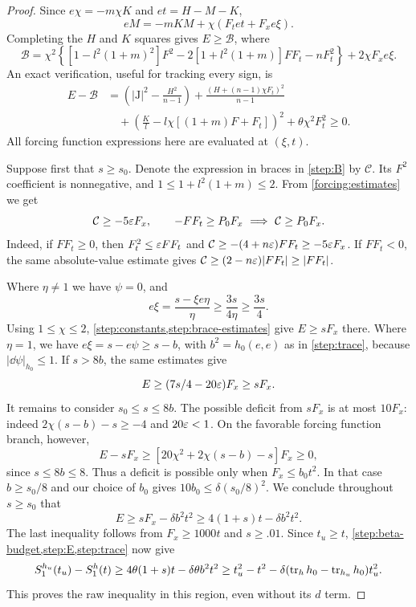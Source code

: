 \begin{proof}
Since $e\chi=-m\chi K$ and $et=H-M-K$,
\[
 eM=-mKM+\chi(F_t et+F_xe\xi).
\]
Completing the $H$ and $K$ squares gives $E\ge\mathcal B$, where
\begin{equation}\label{step:B}
 \mathcal B=\chi^2\left\{
 [1-l^2(1+m)^2]F^2
 -2[1+l^2(1+m)]FF_t-nF_t^2\right\}
 +2\chi F_xe\xi.
\end{equation}
An exact verification, useful for tracking every sign, is
\begin{align*}
 E-\mathcal B
 &=\left(|\mathrm J|^2-\frac{H^2}{n-1}\right)
 +\frac{(H+(n-1)\chi F_t)^2}{n-1}\\
 &\quad+\left(\frac K l-l\chi[(1+m)F+F_t]\right)^2
 +\theta\chi^2F_t^2\ge0.
\end{align*}
All forcing function expressions here are evaluated at $(\xi,t)$.

Suppose first that $s\ge s_0$.  Denote the expression in braces in
\cref{step:B} by $\mathcal C$.  Its $F^2$ coefficient is nonnegative,
and $1\le1+l^2(1+m)\le2$.  From \cref{forcing:estimates} we get
\begin{equation}\label{step:brace-estimates}
 \mathcal C\ge-5\varepsilon F_x,
 \qquad
 -FF_t\ge P_0F_x\ \Longrightarrow\ \mathcal C\ge P_0F_x.
\end{equation}
Indeed, if $FF_t\ge0$, then $F_t^2\le\varepsilon FF_t$ and
$\mathcal C\ge-(4+n\varepsilon)FF_t\ge-5\varepsilon F_x$.
If $FF_t<0$, the same absolute-value estimate gives
$\mathcal C\ge(2-n\varepsilon)|FF_t|\ge|FF_t|$.

Where $\eta\ne1$ we have $\psi=0$, and
\[
 e\xi=\frac{s-\xi e\eta}{\eta}\ge\frac{3s}{4\eta}\ge\frac{3s}4.
\]
Using $1\le\chi\le2$, \cref{step:constants,step:brace-estimates}
give $E\ge sF_x$ there.  Where $\eta=1$, we have
$e\xi=s-e\psi\ge s-b$, with $b^2=h_0(e,e)$ as in \cref{step:trace},
because $|\dd\psi|_{h_0}\le1$.
If $s>8b$, the same estimates give
\[
 E\ge(7s/4-20\varepsilon)F_x\ge sF_x.
\]
It remains to consider $s_0\le s\le8b$.  The possible deficit from
$sF_x$ is at most $10F_x$: indeed
$2\chi(s-b)-s\ge-4$ and $20\varepsilon<1$.
On the favorable forcing function branch, however,
\[
 E-sF_x\ge[20\chi^2+2\chi(s-b)-s]F_x\ge0,
\]
since $s\le8b\le8$.  Thus a deficit is possible only when
$F_x\le b_0t^2$.  In that case $b\ge s_0/8$ and our choice of $b_0$
gives $10b_0\le\delta(s_0/8)^2$.  We conclude throughout $s\ge s_0$
that
\begin{equation}\label{step:large-slope}
 E\ge sF_x-\delta b^2t^2
 \ge4(1+s)t-\delta b^2t^2.
\end{equation}
The last inequality follows from $F_x\ge1000t$ and $s\ge.01$.
Since $t_u\ge t$, \cref{step:beta-budget,step:E,step:trace} now give
\[
 S^{h_u}_1(t_u)-S^{h}_1(t)
 \ge4\theta(1+s)t-\delta\theta b^2t^2
 \ge t_u^2-t^2
   -\delta(\operatorname{tr}_hh_0-\operatorname{tr}_{h_u}h_0)t_u^2.
\]
This proves the raw inequality in this region, even without its $d$ term.


\end{proof}
